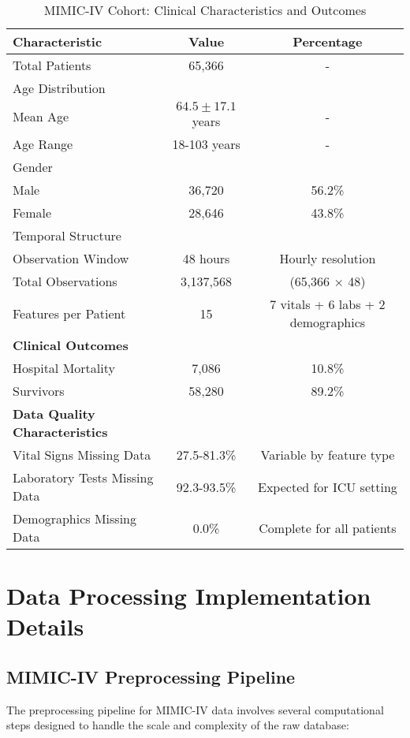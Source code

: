 \documentclass[letterpaper]{article}
\begin{document}
\begin{table}[htbp]
\centering
\caption{MIMIC-IV Cohort: Clinical Characteristics and Outcomes}
\label{tab:mimic_cohort}
\begin{tabular}{@{}lcc@{}}
\toprule
\textbf{Characteristic} & \textbf{Value} & \textbf{Percentage} \\
\midrule
Total Patients & 65,366 & - \\
Age Distribution & & \\
\quad Mean Age & $64.5 \pm 17.1$ years & - \\
\quad Age Range & 18-103 years & - \\
Gender & & \\
\quad Male & 36,720 & 56.2\% \\
\quad Female & 28,646 & 43.8\% \\
Temporal Structure & & \\
\quad Observation Window & 48 hours & Hourly resolution \\
\quad Total Observations & 3,137,568 & (65,366 × 48) \\
\quad Features per Patient & 15 & 7 vitals + 6 labs + 2 demographics \\
\midrule
\textbf{Clinical Outcomes} & & \\
Hospital Mortality & 7,086 & 10.8\% \\
Survivors & 58,280 & 89.2\% \\
\midrule
\textbf{Data Quality Characteristics} & & \\
Vital Signs Missing Data & 27.5-81.3\% & Variable by feature type \\
Laboratory Tests Missing Data & 92.3-93.5\% & Expected for ICU setting \\
Demographics Missing Data & 0.0\% & Complete for all patients \\
\bottomrule
\end{tabular}
\end{table}

\section{Data Processing Implementation Details}

\subsection{MIMIC-IV Preprocessing Pipeline}

The preprocessing pipeline for MIMIC-IV data involves several computational steps designed to handle the scale and complexity of the raw database:
\end{document}
